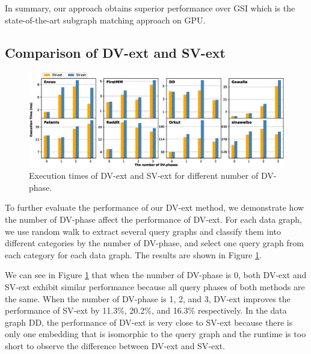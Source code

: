 In summary, our approach obtains superior performance over GSI which is the state-of-the-art subgraph matching approach on GPU.

\subsection{Comparison of DV-ext and SV-ext} \label{sec:comparesv}
\begin{figure}
\centering
\includegraphics[width=\textwidth]{./figure/compareSV.eps}
\caption{Execution times of DV-ext and SV-ext for different number of DV-phase.}	
\label{fig:compareSV}
\end{figure}
To further evaluate the performance of our DV-ext method, we demonstrate how the number of DV-phase affect the performance of DV-ext. For each data graph, we use random walk to extract several query graphs and classify them into different categories by the number of DV-phase, and select one query graph from each category for each data graph. The results are shown in Figure \ref{fig:compareSV}.

We can see in Figure \ref{fig:compareSV} that when the number of DV-phase is 0, both DV-ext and SV-ext exhibit similar performance because all query phases of both methods are the same. When the number of DV-phase is 1, 2, and 3, DV-ext improves the performance of SV-ext by 11.3\%, 20.2\%, and 16.3\% respectively. In the data graph DD, the performance of DV-ext is very close to SV-ext because there is only one embedding that is isomorphic to the query graph and the runtime is too short to observe the difference between DV-ext and SV-ext.
